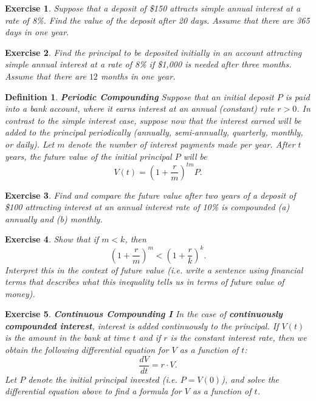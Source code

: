 \documentclass[letterpaper,10pt]{article}
\newtheorem{df}{Definition}[section]
\newtheorem{ex}{Exercise}
\begin{document}
\begin{ex}
Suppose that a deposit of \$150 attracts simple annual interest at a rate of 8\%.  Find the value of the deposit after 20 days.  Assume that there are 365 days in one year.  
\end{ex}

\begin{ex}
Find the principal to be deposited initially in an account attracting simple annual interest at a rate of 8\% if \$1,000 is needed after three months.  Assume that there are $12$ months in one year.
\end{ex}




\begin{df}{\bf Periodic Compounding}
Suppose that an initial deposit $P$ is paid into a bank account, where it earns interest at an annual (constant) rate $r>0$.  In contrast to the simple interest case, suppose now that the interest earned will be added to the principal periodically (annually, semi-annually, quarterly, monthly, or daily).  Let $m$ denote the number of interest payments made per year.  After $t$ years, the {\em future value} of the initial principal $P$ will be $$V(t)=\left(1+\frac{r}{m}\right)^{tm}P.$$  
\end{df}

\begin{ex}
Find and compare the future value after two years of a deposit of \$100 attracting interest at an annual interest rate of 10\% is compounded (a) annually and (b) monthly. 
\end{ex}

\begin{ex}
Show that if $m<k$, then $$\left(1+\frac{r}{m}\right)^m<\left(1+\frac{r}{k}\right)^k.$$  Interpret this in the context of future value (i.e. write a sentence using financial terms that describes what this inequality tells us in terms of future value of money).  
\end{ex}


\begin{ex}{\bf Continuous Compounding I}
In the case of {\bf continuously compounded interest}, interest is added {\em continuously} to the principal.  If $V(t)$ is the amount in the bank at time $t$ and if $r$ is the constant interest rate, then we obtain the following differential equation for $V$ as a function of $t$:  $$\frac{dV}{dt}=r\cdot V.$$  Let $P$ denote the initial principal invested (i.e. $P=V(0)$), and solve the differential equation above to find a formula for $V$ as a function of $t$.
\end{ex}
\end{document}
